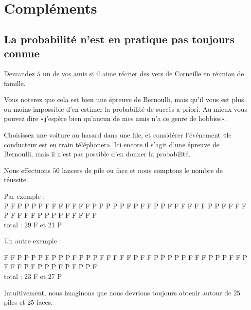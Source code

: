 \section{Compléments}

\subsection{La probabilité n'est en pratique pas toujours connue}

\begin{example}
    Demandez à un de vos amis si il aime réciter des vers de Corneille en réunion de famille.

    Vous noterez que cela est bien une épreuve de Bernoulli, mais qu'il vous est plus ou moins impossible d'en estimer la probabilité de succès a priori. Au mieux vous pouvez dire «j'espère bien qu'aucun de mes amis n'a ce genre de hobbies».
    
\end{example}

\begin{example}
    Choisissez une voiture au hasard dans une file, et considérer l'événement «le conducteur est en train téléphoner». Ici encore il s'agit d'une épreuve de Bernoulli, mais il n'est pas possible d'en donner la probabilité.
\end{example}

\begin{example}
Nous effectuons \( 50\) lancers de pile ou face et nous comptons le nombre de réussite.

Par exemple :\\
P F P P P P F F F F F F F P P P P P F P F F P P F F F F F F P P F F F F P F F F F P P P P F F F F P \\
 total : 29 F et  21 P
 
Un autre exemple :

F F P P P P F P P P F P P P F F F F F P F F P P P P P F F F P P P F F P F F F P F P P P F P F P P F \\
 total : 23 F et  27 P

 Intuitivement, nous imaginons que nous devrions toujours obtenir autour de \( 25\) piles et \( 25\) faces.
    
\end{example}

